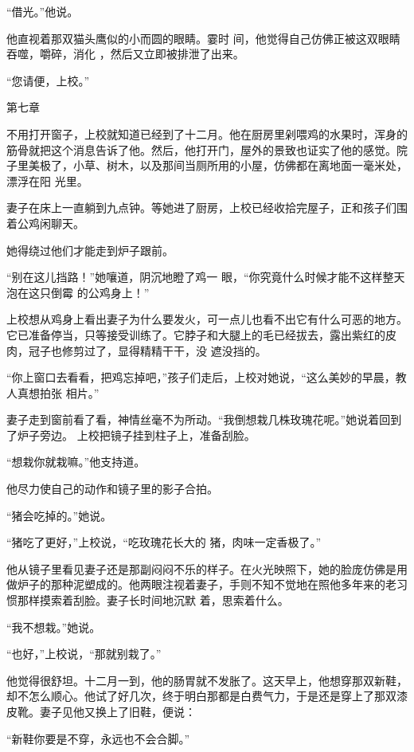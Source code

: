 \documentclass{article}
\begin{document}
“借光。”他说。 

他直视着那双猫头鹰似的小而圆的眼睛。霎时
\newpage
间，他觉得自己仿佛正被这双眼睛吞噬，嚼碎，消化
，然后又立即被排泄了出来。 


“您请便，上校。” 



第七章 

不用打开窗子，上校就知道已经到了十二月。他在厨房里剁喂鸡的水果时，浑身的筋骨就把这个消息告诉了他。然后，他打开门，屋外的景致也证实了他的感觉。院子里美极了，小草、树木，以及那间当厕所用的小屋，仿佛都在离地面一毫米处，漂浮在阳
光里。 

妻子在床上一直躺到九点钟。等她进了厨房，上校已经收拾完屋子，正和孩子们围着公鸡闲聊天。


她得绕过他们才能走到炉子跟前。 

“别在这儿挡路！”她嚷道，阴沉地瞪了鸡一
\newpage
眼，“你究竟什么时候才能不这样整天泡在这只倒霉
的公鸡身上！” 

上校想从鸡身上看出妻子为什么要发火，可一点儿也看不出它有什么可恶的地方。它已准备停当，只等接受训练了。它脖子和大腿上的毛已经拔去，露出紫红的皮肉，冠子也修剪过了，显得精精干干，没
遮没挡的。 

“你上窗口去看看，把鸡忘掉吧，”孩子们走后，上校对她说，“这么美妙的早晨，教人真想拍张
相片。” 

妻子走到窗前看了看，神情丝毫不为所动。“我倒想栽几株玫瑰花呢。”她说着回到了炉子旁边。
上校把镜子挂到柱子上，准备刮脸。 


“想栽你就栽嘛。”他支持道。 


他尽力使自己的动作和镜子里的影子合拍。 

\newpage


“猪会吃掉的。”她说。 

“猪吃了更好，”上校说，“吃玫瑰花长大的
猪，肉味一定香极了。” 

他从镜子里看见妻子还是那副闷闷不乐的样子。在火光映照下，她的脸庞仿佛是用做炉子的那种泥塑成的。他两眼注视着妻子，手则不知不觉地在照他多年来的老习惯那样摸索着刮脸。妻子长时间地沉默
着，思索着什么。 


“我不想栽。”她说。 


“也好，”上校说，“那就别栽了。” 

他觉得很舒坦。十二月一到，他的肠胃就不发胀了。这天早上，他想穿那双新鞋，却不怎么顺心。他试了好几次，终于明白那都是白费气力，于是还是穿上了那双漆皮靴。妻子见他又换上了旧鞋，便说：


\newpage

“新鞋你要是不穿，永远也不会合脚。” 
\end{document}
